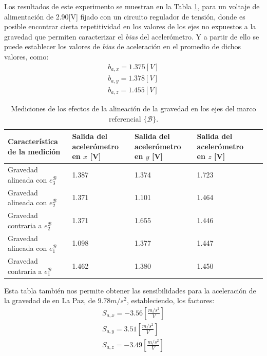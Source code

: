 \documentclass[10pt]{report}
\numberwithin{equation}{chapter}
\numberwithin{algorithm}{chapter}
\newcommand{\bias}{\emph{bias} }
\newcommand{\marco}[1]{\{\mathcal{#1}\}}
\begin{document}
Los resultados de este experimento se muestran en la Tabla \ref{ooekf_tb3}, para un voltaje de alimentación de 2.90[V] fijado con un circuito regulador de tensión, donde es posible encontrar cierta repetitividad en los valores de los ejes no expuestos a la gravedad que permiten caracterizar el \bias del acelerómetro. Y a partir de ello se puede establecer los valores de \bias de aceleración en el promedio de dichos valores, como:
\begin{gather*}
b_{a,x}=1.375[V]\\
b_{a,y}=1.378[V]\\
b_{a,z}=1.455[V]
\end{gather*}
\begin{table}[t]
\begin{center}
\begin{scriptsize}
\begin{tabular}{p{2.5cm}|p{2.5cm}|p{2.5cm}|p{2.5cm}c} \hline
\center\textbf{Característica de la medición}& \center\textbf{Salida del acelerómetro en $x$ [V]}&\center\textbf{Salida del acelerómetro en $y$ [V]}&\center\textbf{Salida del acelerómetro en $z$ [V]}&\\ \hline
Gravedad alineada con $e_3^\mathcal{B}$&1.387&1.374&1.723\\
Gravedad alineada con $e_2^\mathcal{B}$&1.371&1.101&1.464\\
Gravedad contraria a $e_2^\mathcal{B}$&1.371&1.655&1.446\\
Gravedad alineada con $e_1^\mathcal{B}$&1.098&1.377&1.447\\
Gravedad contraria a $e_1^\mathcal{B}$&1.462&1.380&1.450\\ \hline
\end{tabular}
\end{scriptsize}
\caption{Mediciones de los efectos de la alineación de la gravedad en los ejes del marco referencial $\marco{B}$.} 
\label{ooekf_tb3}
\end{center}
\end{table}
Esta tabla también nos permite obtener las sensibilidades para la aceleración de la gravedad de en La Paz, de $9.78m/s^2$, estableciendo, los factores:
\begin{gather*}
S_{a,x}=-3.56[\frac{m/s^2}{V}]\\
S_{a,y}=3.51[\frac{m/s^2}{V}]\\
S_{a,z}=-3.49[\frac{m/s^2}{V}]
\end{gather*}
\end{document}
